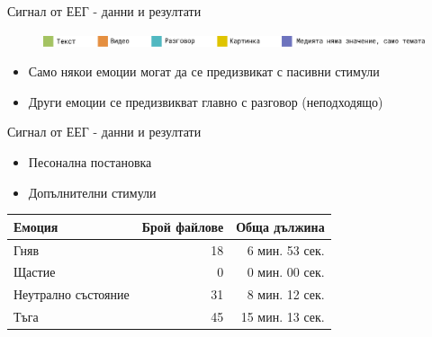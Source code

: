 \documentclass[9pt]{beamer}
\begin{document}
\begin{frame}[c]{Сигнал от ЕЕГ - данни и резултати}
\begin{figure}[H]
{            }
            \hfill
            \vspace{1cm}
            \includegraphics[width=\textwidth]{legend}%
        \end{figure}
        \pause
        \begin{itemize}
            \pause
            \item Само някои емоции могат да се предизвикат с пасивни стимули
            \pause
            \item Други емоции се предизвикват главно с разговор (неподходящо)
        \end{itemize}
    \end{frame}
    
    \begin{frame}[t]{Сигнал от ЕЕГ - данни и резултати}
        \begin{itemize}
            \pause
            \item Песонална постановка
            \pause
            \item Допълнителни стимули 
        \end{itemize}
        \pause
        \begin{center}
            \begin{tabular}{|l|r|r|} 
                \hline
                Емоция & Брой файлове & Обща дължина\\ 
                \hline
                Гняв & 18 & 6 мин. 53 сек.\\ 
                Щастие & 0 & 0 мин. 00 сек. \\ 
                Неутрално състояние & 31 & 8 мин. 12 сек. \\ 
                Тъга & 45 & 15 мин. 13 сек. \\ 
                \hline
            \end{tabular}
        \end{center}
    \end{frame}
\end{document}

